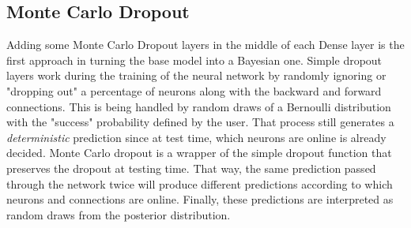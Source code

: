 \documentclass[11pt,twoside]{article}
\numberwithin{Theorem}{section}
\numberwithin{Definition}{section}
\numberwithin{Lemma}{section}
\numberwithin{Algorithm}{section}
\numberwithin{equation}{section}
\begin{document}
\subsection{Monte Carlo Dropout}
\label{sec:BNN}
Adding some Monte Carlo Dropout layers in the middle of each Dense layer is the first approach in turning the base model into a Bayesian one. Simple dropout layers work during the training of the neural network by randomly ignoring or "dropping out" a percentage of neurons along with the backward and forward connections. This is being handled by random draws of a Bernoulli distribution with the "success" probability defined by the user. That process still generates a \textit{deterministic} prediction since at test time, which neurons are online is already decided. Monte Carlo dropout is a wrapper of the simple dropout function that preserves the dropout at testing time. That way, the same prediction passed through the network twice will produce different predictions according to which neurons and connections are online. Finally, these predictions are interpreted as random draws from the posterior distribution.
\vspace*{1.5em}
\end{document}
